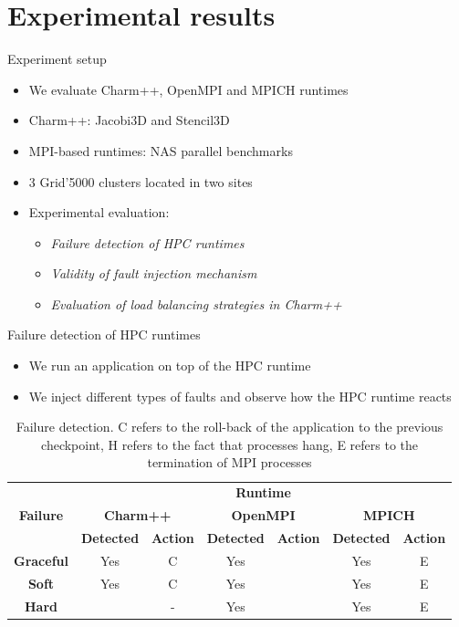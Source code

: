 \documentclass[11pt,xcolor=dvipsnames,presentation]{beamer}
\begin{document}
\section{Experimental results}
\label{sec-2}
\begin{frame}[label=sec-2-0-1]{Experiment setup}
\begin{itemize}
\item We evaluate Charm++, OpenMPI and MPICH runtimes
\item Charm++: Jacobi3D and Stencil3D
\item MPI-based runtimes:  NAS parallel benchmarks

\item 3 Grid'5000 clusters located in two sites

\item Experimental evaluation:
\begin{itemize}
\item \emph{Failure detection of HPC runtimes}
\item \emph{Validity of fault injection mechanism}
\item \emph{Evaluation of load balancing strategies in Charm++}
\end{itemize}
\end{itemize}
\end{frame}

\begin{frame}[label=sec-2-0-2]{Failure detection of HPC runtimes}
\begin{itemize}
\item We run an application on top of the HPC runtime
\item We inject different types of faults and observe how the HPC runtime reacts
\end{itemize}


\begin{table}[ht!]
  { \scriptsize
  \begin{tabular}{|c|c|c|c|c|c|c|}
  \hline
  \multirow{3}{*}{\textbf{Failure}} &
  \multicolumn{6}{c|}{\textbf{Runtime}}  \\
  \cline{1-7}
  &\multicolumn{2}{c}{\textbf{Charm++}}&
  \multicolumn{2}{|c}{\textbf{OpenMPI}}&
  \multicolumn{2}{|c|}{\textbf{MPICH}}\\
  \cline{2-7}
  &\textbf{Detected} & \textbf{Action} & \textbf{Detected} & \textbf{Action} & \textbf{Detected} & \textbf{Action}  \\
  \hline
  \textbf{Graceful}  &   Yes  & C   &  Yes   &  \color{red}{H}  &  Yes   &  E   \\
  \textbf{Soft}  &       Yes  & C   &  Yes   &  \color{red}{H}  &  Yes   &  E   \\
  \textbf{Hard}   &      \color{red}{No}   & -   &  Yes   &  \color{red}{H}  &  Yes   &  E   \\
  \hline
  \end{tabular}
  }
  \caption{Failure detection. C refers to the roll-back of the application to the previous checkpoint,
  H refers to the fact that processes hang, E refers to the termination of MPI processes}
  \label{table:assess_HPC_runtimes}
\end{table}
\end{frame}
\end{document}
